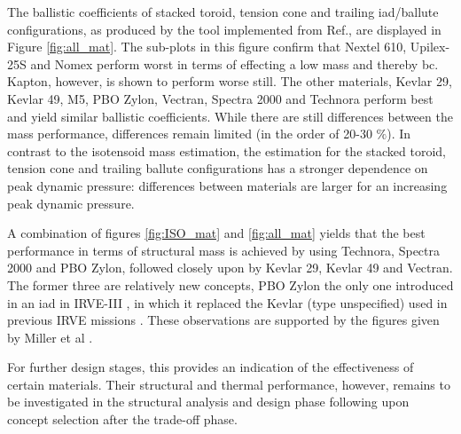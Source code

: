 The ballistic coefficients of stacked toroid, tension cone and trailing \gls{iad}/ballute configurations, as produced by the tool implemented from Ref.\cite{Samareh2011}, are displayed in Figure \ref{fig:all_mat}. The sub-plots in this figure confirm that Nextel 610, Upilex-25S and Nomex perform worst in terms of effecting a low mass and thereby \gls{bc}. Kapton, however, is shown to perform worse still. The other materials, Kevlar 29, Kevlar 49, M5, PBO Zylon, Vectran, Spectra 2000 and Technora perform best and yield similar ballistic coefficients. While there are still differences between the mass performance, differences remain limited (in the order of 20-30 $\%$). In contrast to the isotensoid mass estimation, the estimation for the stacked toroid, tension cone and trailing ballute configurations has a stronger dependence on peak dynamic pressure: differences between materials are larger for an increasing peak dynamic pressure.

A combination of figures \ref{fig:ISO_mat} and \ref{fig:all_mat} yields that the best performance in terms of structural mass is achieved by using Technora, Spectra 2000 and PBO Zylon, followed closely upon by Kevlar 29, Kevlar 49 and Vectran. The former three are relatively new concepts, PBO Zylon the only one introduced in an \gls{iad} in IRVE-III \cite{Dillman2012}, in which it replaced the Kevlar (type unspecified) used in previous IRVE missions \cite{Lindell2006}. These observations are supported by the figures given by Miller et al \cite[p.7-p.8]{Miller2014}. 

For further design stages, this provides an indication of the effectiveness of certain materials. Their structural and thermal performance, however, remains to be investigated in the structural analysis and design phase following upon concept selection after the trade-off phase. 


